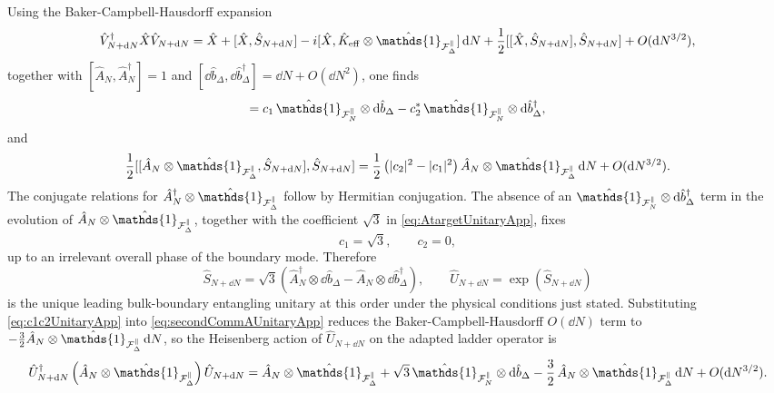 \documentclass{article}
\def\cF{{\cal F}}
\newcommand{\openone}{\hat{\mathds{1}}}
\numberwithin{equation}{section}
\begin{document}
	Using the Baker-Campbell-Hausdorff expansion
	\begin{equation}
		\hat V_{N+\dd N}^\dagger \hat X \hat V_{N+\dd N} = \hat X + [\hat X,\hat S_{N+\dd N}] - i[\hat X,\hat K_{\rm eff}\otimes\openone_{\cF_\Delta^\parallel}]\,\dd N + \frac12[[\hat X,\hat S_{N+\dd N}],\hat S_{N+\dd N}] + O(\dd N^{3/2}),
		\label{eq:BCHUnitaryApp}
	\end{equation}
	together with \([\hat A_N,\hat A_N^\dagger]=1\) and \([\dd\hat b_\Delta,\dd\hat b_\Delta^\dagger]=\dd N+O(\dd N^2)\), one finds
	\begin{equation}
		[\hat A_N\otimes\openone_{\cF_\Delta^\parallel},\hat S_{N+\dd N}] = c_1\,\openone_{\cF_N^\parallel}\otimes \dd\hat b_\Delta - c_2^*\,\openone_{\cF_N^\parallel}\otimes \dd\hat b_\Delta^\dagger,
		\label{eq:firstCommAUnitaryApp}
	\end{equation}
	and
	\begin{equation}
		\frac12[[\hat A_N\otimes\openone_{\cF_\Delta^\parallel},\hat S_{N+\dd N}],\hat S_{N+\dd N}] = \frac12\left( |c_2|^2-|c_1|^2 \right)\hat A_N\otimes\openone_{\cF_\Delta^\parallel}\,\dd N + O(\dd N^{3/2}).
		\label{eq:secondCommAUnitaryApp}
	\end{equation}
	The conjugate relations for \(\hat A_N^\dagger\otimes\openone_{\cF_\Delta^\parallel}\) follow by Hermitian conjugation. The absence of an \(\openone_{\cF_N^\parallel}\otimes \dd\hat b_\Delta^\dagger\) term in the evolution of \(\hat A_N\otimes\openone_{\cF_\Delta^\parallel}\), together with the coefficient \(\sqrt3\) in \cref{eq:AtargetUnitaryApp}, fixes
	\begin{equation}
		c_1=\sqrt3, \qquad c_2=0,
		\label{eq:c1c2UnitaryApp}
	\end{equation}
	up to an irrelevant overall phase of the boundary mode. Therefore
	\begin{equation}
		\hat S_{N+\dd N} = \sqrt3 \left( \hat A_N^\dagger\otimes \dd\hat b_\Delta - \hat A_N\otimes \dd\hat b_\Delta^\dagger \right), \qquad \hat U_{N+\dd N} = \exp(\hat S_{N+\dd N})
		\label{eq:UNbeamsplitter}
	\end{equation}
	is the unique leading bulk-boundary entangling unitary at this order under the physical conditions just stated. Substituting \cref{eq:c1c2UnitaryApp} into \cref{eq:secondCommAUnitaryApp} reduces the Baker-Campbell-Hausdorff \(O(\dd N)\) term to \(-\tfrac32\hat A_N\otimes\openone_{\cF_\Delta^\parallel}\,\dd N\), so the Heisenberg action of \(\hat U_{N+\dd N}\) on the adapted ladder operator is
	\begin{equation}
		\hat U_{N+\dd N}^\dagger \left( \hat A_N\otimes\openone_{\cF_\Delta^\parallel} \right) \hat U_{N+\dd N} = \hat A_N\otimes\openone_{\cF_\Delta^\parallel} + \sqrt3\,\openone_{\cF_N^\parallel}\otimes \dd\hat b_\Delta - \frac32\,\hat A_N\otimes\openone_{\cF_\Delta^\parallel}\,\dd N + O(\dd N^{3/2}).
		\label{eq:UActionAUnitaryApp}
	\end{equation}
\end{document}
